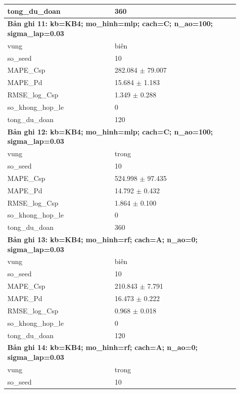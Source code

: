 \begin{longtable}{p{0.43\linewidth}p{0.50\linewidth}}
tong\_\allowbreak du\_\allowbreak doan & 360 \\
\midrule
\multicolumn{2}{p{0.95\linewidth}}{\textbf{Bản ghi 11: kb=KB4; mo\_hinh=mlp; cach=C; n\_ao=100; sigma\_lap=0.03}} \\
vung & biên \\
so\_\allowbreak seed & 10 \\
MAPE\_\allowbreak Csp & 282.084 $\pm$ 79.007 \\
MAPE\_\allowbreak Pd & 15.684 $\pm$ 1.183 \\
RMSE\_\allowbreak log\_\allowbreak Csp & 1.349 $\pm$ 0.288 \\
so\_\allowbreak khong\_\allowbreak hop\_\allowbreak le & 0 \\
tong\_\allowbreak du\_\allowbreak doan & 120 \\
\midrule
\multicolumn{2}{p{0.95\linewidth}}{\textbf{Bản ghi 12: kb=KB4; mo\_hinh=mlp; cach=C; n\_ao=100; sigma\_lap=0.03}} \\
vung & trong \\
so\_\allowbreak seed & 10 \\
MAPE\_\allowbreak Csp & 524.998 $\pm$ 97.435 \\
MAPE\_\allowbreak Pd & 14.792 $\pm$ 0.432 \\
RMSE\_\allowbreak log\_\allowbreak Csp & 1.864 $\pm$ 0.100 \\
so\_\allowbreak khong\_\allowbreak hop\_\allowbreak le & 0 \\
tong\_\allowbreak du\_\allowbreak doan & 360 \\
\midrule
\multicolumn{2}{p{0.95\linewidth}}{\textbf{Bản ghi 13: kb=KB4; mo\_hinh=rf; cach=A; n\_ao=0; sigma\_lap=0.03}} \\
vung & biên \\
so\_\allowbreak seed & 10 \\
MAPE\_\allowbreak Csp & 210.843 $\pm$ 7.791 \\
MAPE\_\allowbreak Pd & 16.473 $\pm$ 0.222 \\
RMSE\_\allowbreak log\_\allowbreak Csp & 0.968 $\pm$ 0.018 \\
so\_\allowbreak khong\_\allowbreak hop\_\allowbreak le & 0 \\
tong\_\allowbreak du\_\allowbreak doan & 120 \\
\midrule
\multicolumn{2}{p{0.95\linewidth}}{\textbf{Bản ghi 14: kb=KB4; mo\_hinh=rf; cach=A; n\_ao=0; sigma\_lap=0.03}} \\
vung & trong \\
so\_\allowbreak seed & 10 \\

\end{longtable}
